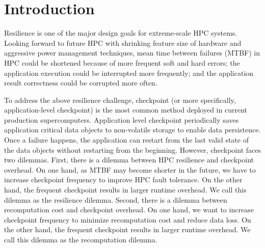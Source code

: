 \section{Introduction}
\label{sec:intro}

\begin{comment}
``while programmers may program directly with persistence primitives, they require
a sophisticated understanding of recovery protocols similar to databases or file system.
Durable transactions provide a much simpler interface to persistent memory and
require few application changes, so we concentrate our evaluation on transaction performance.''

``The cost of durable transaction sis two writes to SCM for every update: xxxx.
Other consistent-update mechanisms may perform better. But, they come at
the cost of increased complexity, such as recovery code to replay logs for append-only updates, garbage collection for memory lost during shadow updates, and explicit fences to order updates.''

``make it persistent by allocating it from a persistent heap and wrapping updates in transactions''
\end{comment}

Resilience  is  one  of  the  major  design  goals  for extreme-scale HPC systems.  Looking forward to future HPC with shrinking feature size of hardware and aggressive
power management techniques, mean time between failures (MTBF) in HPC
could be shortened because of more frequent soft and hard errors;
the application execution could be interrupted more frequently;
and the application result correctness could be corrupted more often.

To address the above resilience challenge, checkpoint (or more specifically, application-level checkpoint) is the most common method deployed in current production supercomputers.
Application level checkpoint periodically saves application critical data objects to non-volatile storage %
to enable data persistence.
Once a failure happens, the application can restart from the last valid state of the data objects without restarting from the beginning.
However, checkpoint faces two dilemmas. 
First, there is a dilemma between HPC resilience and checkpoint overhead.
On one hand, as MTBF may become shorter in the future, 
we have to increase checkpoint frequency to improve HPC fault tolerance.
On the other hand, the frequent checkpoint results in larger runtime overhead.
We call this dilemma as the resilience dilemma.
Second, there is a dilemma between recomputation cost
and checkpoint overhead. 
On one hand, we want to increase checkpoint frequency to 
minimize recomputation cost and reduce data loss. 
On the other hand, the frequent checkpoint results in larger runtime overhead. We call this dilemma as the recomputation dilemma.

